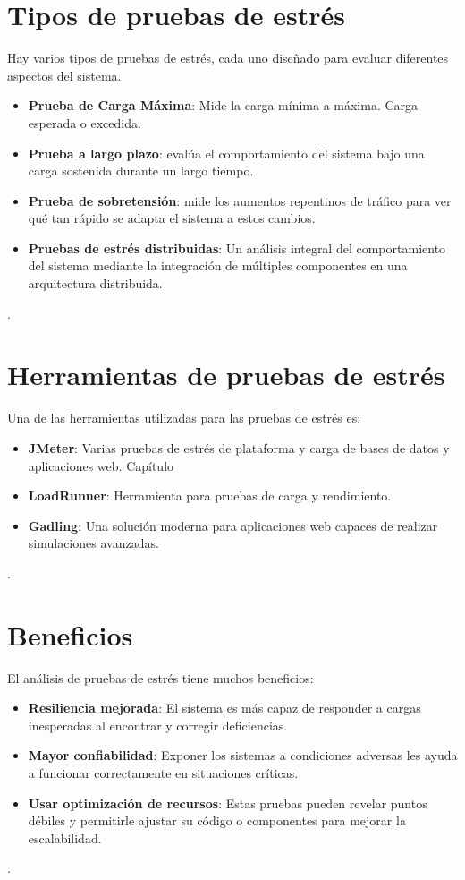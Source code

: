 \documentclass[a4paper,12pt]{article}
\begin{document}
\section{Tipos de pruebas de estrés}
Hay varios tipos de pruebas de estrés, cada uno diseñado para evaluar diferentes aspectos del sistema.
\begin{itemize}
    \item \textbf{Prueba de Carga Máxima}: Mide la carga mínima a máxima. Carga esperada o excedida.
    \item \textbf{Prueba a largo plazo}: evalúa el comportamiento del sistema bajo una carga sostenida durante un largo tiempo.
    \item \textbf{Prueba de sobretensión}: mide los aumentos repentinos de tráfico para ver qué tan rápido se adapta el sistema a estos cambios.
    \item \textbf{Pruebas de estrés distribuidas}: Un análisis integral del comportamiento del sistema mediante la integración de múltiples componentes en una arquitectura distribuida.
\end{itemize}.

\section{Herramientas de pruebas de estrés}
Una de las herramientas utilizadas para las pruebas de estrés es:
\begin{itemize}
\item \textbf{JMeter}: Varias pruebas de estrés de plataforma y carga de bases de datos y aplicaciones web. Capítulo
\item \textbf{LoadRunner}: Herramienta para pruebas de carga y rendimiento.
\item \textbf{Gadling}: Una solución moderna para aplicaciones web capaces de realizar simulaciones avanzadas.
\end{itemize}.

\section{Beneficios}
El análisis de pruebas de estrés tiene muchos beneficios:
\begin{itemize}
\item \textbf{Resiliencia mejorada}: El sistema es más capaz de responder a cargas inesperadas al encontrar y corregir deficiencias.
\item \textbf{Mayor confiabilidad}: Exponer los sistemas a condiciones adversas les ayuda a funcionar correctamente en situaciones críticas.
\item \textbf{Usar optimización de recursos}: Estas pruebas pueden revelar puntos débiles y permitirle ajustar su código o componentes para mejorar la escalabilidad.
\end{itemize}.
\end{document}
